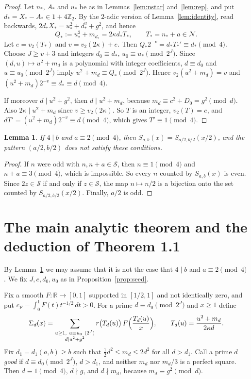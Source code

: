 \documentclass[11pt]{amsart}
\newtheorem{lemma}[theorem]{Lemma}
\theoremstyle{remark}
\theoremstyle{definition}
\numberwithin{equation}{section}
\newcommand{\Sc}{\mathcal{S}}
\newcommand{\Nc}{\mathcal{N}}
\newcommand{\Zt}{\mathbb{Z}_2}
\newcommand{\R}{\mathbb{R}}
\begin{document}
\begin{proof}
Let $n_*$, $A_*$ and $u_*$ be as in Lemmas~\ref{lem:nstar} and~\ref{lem:rep}, and put $d_*=X_*-A_*\in1+4\Zt$. By the $2$-adic version of Lemma~\ref{lem:identity}, read backwards, $2d_*X_*=u_*^2+d_*^2+g^2$, and hence
\[
Q_*:=u_*^2+m_{d_*}=2\kappa d_*T_*,\qquad T_*=n_*+a\in\Nc .
\]
Let $e=v_2(T_*)$ and $v=v_2(2\kappa)+e$. Then $Q_*2^{-v}=d_*T_*'\equiv d_*\pmod 4$. Choose $J\ge v+3$ and integers $d_0\equiv d_*$, $u_0\equiv u_*\pmod{2^J}$. Since $(d,u)\mapsto u^2+m_d$ is a polynomial with integer coefficients, $d\equiv d_0$ and $u\equiv u_0\pmod{2^J}$ imply $u^2+m_d\equiv Q_*\pmod{2^J}$. Hence $v_2(u^2+m_d)=v$ and $(u^2+m_d)2^{-v}\equiv d_*\equiv d\pmod4$.

If moreover $d\mid u^2+g^2$, then $d\mid u^2+m_d$, because $m_d\equiv c^2+D_0=g^2\pmod d$. Also $2\kappa\mid u^2+m_d$ since $v\ge v_2(2\kappa)$. So $T$ is an integer, $v_2(T)=e$, and $dT'=(u^2+m_d)2^{-v}\equiv d\pmod4$, which gives $T'\equiv1\pmod 4$.
\end{proof}

\begin{lemma}\label{lem:bad}
If $4\mid b$ and $a\equiv2\pmod 4$, then $S_{a,b}(x)=S_{a/2,b/2}(x/2)$, and the pattern $(a/2,b/2)$ does not satisfy these conditions.
\end{lemma}

\begin{proof}
If $n$ were odd with $n,n+a\in\Sc$, then $n\equiv1\pmod4$ and $n+a\equiv3\pmod 4$, which is impossible. So every $n$ counted by $S_{a,b}(x)$ is even. Since $2z\in\Sc$ if and only if $z\in\Sc$, the map $n\mapsto n/2$ is a bijection onto the set counted by $S_{a/2,b/2}(x/2)$. Finally, $a/2$ is odd.
\end{proof}

\section{The main analytic theorem and the deduction of Theorem 1.1}

By Lemma~\ref{lem:bad} we may assume that it is not the case that $4\mid b$ and $a\equiv2\pmod 4$. We fix $J,e,d_0,u_0$ as in Proposition~\ref{prop:seed}.

Fix a smooth $F:\R\to[0,1]$ supported in $[1/2,1]$ and not identically zero, and put $c_F=\int_0^1F(t)t^{-1/2}\,dt>0$. For a prime $d\equiv d_0\pmod{2^J}$ and $x\ge1$ define
\begin{equation}\label{eq:Sigma}
\Sigma_d(x)=\sum_{\substack{u\ge1,\ u\equiv u_0\ (2^J)\\ d\mid u^2+g^2}}r\bigl(T_d(u)\bigr)\,F\Bigl(\frac{T_d(u)}{x}\Bigr),\qquad T_d(u)=\frac{u^2+m_d}{2\kappa d}.
\end{equation}
Fix $d_1=d_1(a,b)\ge b$ such that $\frac12d^2\le m_d\le2d^2$ for all $d>d_1$. Call a prime $d$ \emph{good} if $d\equiv d_0\pmod{2^J}$, $d>d_1$, and neither $m_d$ nor $m_d/3$ is a perfect square. Then $d\equiv1\pmod4$, $d\nmid g$, and $d\nmid m_d$, because $m_d\equiv g^2\pmod d$.
\end{document}
